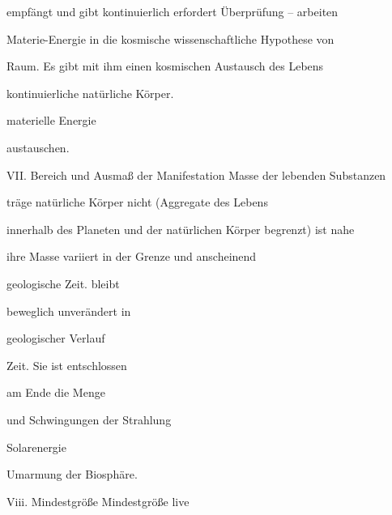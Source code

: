 \documentclass[11pt,a4paper]{book}
\begin{document}
empfängt und gibt kontinuierlich erfordert Überprüfung -- arbeiten



Materie-Energie in die kosmische wissenschaftliche Hypothese von



Raum. Es gibt mit ihm einen kosmischen Austausch des Lebens



kontinuierliche natürliche Körper.



materielle Energie



austauschen.



 



VII. Bereich und Ausmaß der Manifestation Masse der lebenden Substanzen



träge natürliche Körper nicht (Aggregate des Lebens



innerhalb des Planeten und der natürlichen Körper begrenzt) ist nahe



ihre Masse variiert in der Grenze und anscheinend



geologische Zeit. bleibt



                                   beweglich unverändert in



                                   geologischer Verlauf



                                   Zeit. Sie ist entschlossen



                                   am Ende die Menge



                                   und Schwingungen der Strahlung



                                   Solarenergie



                                   Umarmung der Biosphäre.



 



Viii. Mindestgröße Mindestgröße live
\end{document}
